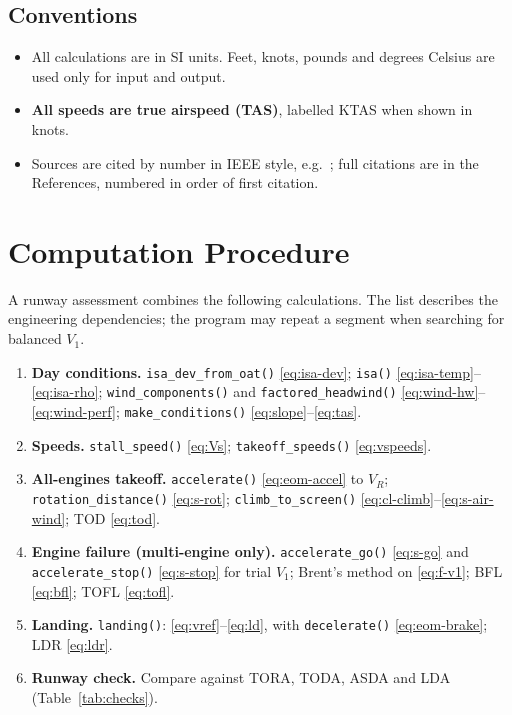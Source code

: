 \documentclass[11pt,letterpaper]{article}
\numberwithin{equation}{section}
\newcommand{\code}[1]{\textmd{\texttt{#1}}}
\begin{document}
\subsection{Conventions}
\begin{itemize}
\item All calculations are in SI units. Feet, knots, pounds and degrees Celsius are used only for input and output.
\item \textbf{All speeds are true airspeed (TAS)}, labelled KTAS when shown in knots.
\item Sources are cited by number in IEEE style, e.g.\ \cite{RAYMER}; full citations are in the References, numbered in order of first citation.
\end{itemize}

\section{Computation Procedure}\label{sec:procedure}
A runway assessment combines the following calculations. The list describes the engineering dependencies; the program may repeat a segment when searching for balanced $V_1$.
\begin{enumerate}\raggedright
\item \textbf{Day conditions.} \code{isa\_dev\_from\_oat()} \eqref{eq:isa-dev}; \code{isa()} \eqref{eq:isa-temp}--\eqref{eq:isa-rho}; \code{wind\_components()} and \code{factored\_headwind()} \eqref{eq:wind-hw}--\eqref{eq:wind-perf}; \code{make\_conditions()} \eqref{eq:slope}--\eqref{eq:tas}.
\item \textbf{Speeds.} \code{stall\_speed()} \eqref{eq:Vs}; \code{takeoff\_speeds()} \eqref{eq:vspeeds}.
\item \textbf{All-engines takeoff.} \code{accelerate()} \eqref{eq:eom-accel} to $V_R$; \code{rotation\_distance()} \eqref{eq:s-rot}; \code{climb\_to\_screen()} \eqref{eq:cl-climb}--\eqref{eq:s-air-wind}; TOD \eqref{eq:tod}.
\item \textbf{Engine failure (multi-engine only).} \code{accelerate\_go()} \eqref{eq:s-go} and \code{accelerate\_stop()} \eqref{eq:s-stop} for trial $V_1$; Brent's method on \eqref{eq:f-v1}; BFL \eqref{eq:bfl}; TOFL \eqref{eq:tofl}.
\item \textbf{Landing.} \code{landing()}: \eqref{eq:vref}--\eqref{eq:ld}, with \code{decelerate()} \eqref{eq:eom-brake}; LDR \eqref{eq:ldr}.
\item \textbf{Runway check.} Compare against TORA, TODA, ASDA and LDA (Table~\ref{tab:checks}).
\end{enumerate}
\end{document}
